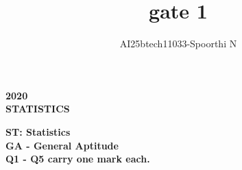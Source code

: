 \documentclass[journal,12pt,onecolumn]{IEEEtran}
\theoremstyle{remark}
\begin{document}
\title{gate 1}
\author{AI25btech11033-Spoorthi N}
\maketitle
\renewcommand{\thefigure}{\theenumi}
\renewcommand{\thetable}{\theenumi}
\begin {center}
\large \textbf{2020}\\
\large \textbf{STATISTICS}\\

\end{center}

\begin{center}
\textbf{ST: Statistics}\\[6pt]
\textbf{GA - General Aptitude}\\[6pt]
\textbf{Q1 - Q5 carry one mark each.}
\end{center}
\end{document}
